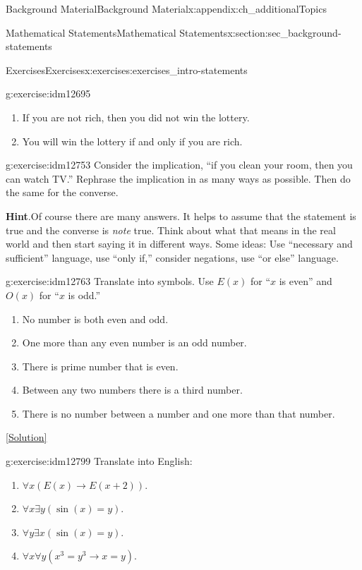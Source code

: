 \documentclass[oneside,10pt,]{book}
\numberwithin{equation}{chapter}
\def\imp{\rightarrow}
\begin{document}
\begin{appendixptx}{Background Material}{}{Background Material}{}{}{x:appendix:ch_additionalTopics}
\begin{sectionptx}{Mathematical Statements}{}{Mathematical Statements}{}{}{x:section:sec_background-statements}
\begin{exercises-subsection}{Exercises}{}{Exercises}{}{}{x:exercises:exercises_intro-statements}
\begin{divisionexercise}{5}{}{}{g:exercise:idm12695}
\begin{enumerate}[label=(\alph*)]
\item{}If you are not rich, then you did not win the lottery.%
\item{}You will win the lottery if and only if you are rich.%
\end{enumerate}
\end{divisionexercise}%
\begin{divisionexercise}{6}{}{}{g:exercise:idm12753}%
Consider the implication, ``if you clean your room, then you can watch TV.'' Rephrase the implication in as many ways as possible. Then do the same for the converse.%
\par\smallskip%
\noindent\textbf{Hint}.\hypertarget{g:hint:idm12757}{}\quad{}Of course there are many answers. It helps to assume that the statement is true and the converse is \emph{note} true. Think about what that means in the real world and then start saying it in different ways. Some ideas: Use ``necessary and sufficient'' language, use ``only if,'' consider negations, use ``or else'' language.%
\end{divisionexercise}%
\begin{divisionexercise}{7}{}{}{g:exercise:idm12763}%
Translate into symbols. Use \(E(x)\) for ``\(x\) is even'' and \(O(x)\) for ``\(x\) is odd.''%
%
\begin{enumerate}[label=(\alph*)]
\item{}No number is both even and odd.%
\item{}One more than any even number is an odd number.%
\item{}There is prime number that is even.%
\item{}Between any two numbers there is a third number.%
\item{}There is no number between a number and one more than that number.%
\end{enumerate}
\space\hspace*{0pt}\hfill{\tiny\hyperlink{g:solution:idm12783-main}{[Solution]}}\end{divisionexercise}%
\begin{divisionexercise}{8}{}{}{g:exercise:idm12799}%
Translate into English:%
\begin{enumerate}[label=(\alph*)]
\item{}\(\forall x (E(x) \imp E(x +2))\).%
\item{}\(\forall x \exists y (\sin(x) = y)\).%
\item{}\(\forall y \exists x (\sin(x) = y)\).%
\item{}\(\forall x \forall y (x^3 = y^3 \imp x = y)\).%

\end{enumerate}
\end{divisionexercise}
\end{exercises-subsection}
\end{sectionptx}
\end{appendixptx}
\end{document}
